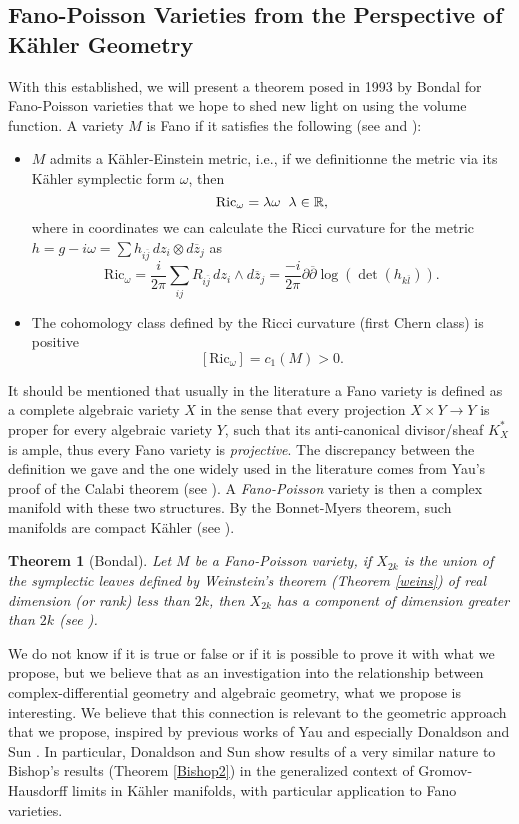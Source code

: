 \documentclass[12pt,twoside,a4paper]{report}
\newtheorem{theorem}{Theorem}[section]
\newcommand{\re}{\ensuremath{\mathbb R }}
\begin{document}
\subsection{Fano-Poisson Varieties from the Perspective of Kähler Geometry}
\noindent With this established, we will present a theorem posed in 1993 by Bondal for Fano-Poisson varieties that we hope to shed new light on using the volume function. A variety $M$ is Fano if it satisfies the following
(see \cite{S-Yau} and \cite{ZB}):
\begin{itemize}
        \item $M$ admits a Kähler-Einstein metric, i.e., if we definitionne the metric via its Kähler symplectic form
        $\omega$, then
                $$\textrm{Ric}_{\omega}=\lambda\omega\hspace{0.2cm}\lambda\in\re,$$
        where in coordinates we can calculate the Ricci curvature for the metric
        \hbox{$h=g-i\omega=\sum h_{i\overline{j}}\,dz_i\otimes d\overline{z}_j$}
        as
$$\textrm{Ric}_{\omega}=\frac{i}{2\pi}\sum_{ij}R_{i\overline{j}}\,dz_i\wedge d\overline{z}_j=\frac{-i}{2\pi}\partial\overline{\partial}\log(\det(h_{k\overline{l}})).$$
        \item The cohomology class defined by the Ricci curvature (first Chern class) is positive
        $$
        [\textrm{Ric}_{\omega}]=c_1(M)>0.
        $$
\end{itemize}
\noindent It should be mentioned that usually in the literature a Fano variety is defined as a complete algebraic variety $X$
in the sense that every projection $X\times Y\rightarrow Y$ is proper for every algebraic variety $Y$, such that its anti-canonical divisor/sheaf
$K^{*}_{X}$ is ample, thus every Fano variety is \emph{projective}. The discrepancy between the definition we gave and the one widely used in
the literature comes from Yau's proof of the Calabi theorem (see \cite{S-Yau}). A
\emph{Fano-Poisson} variety is then a complex manifold with these two structures. By the Bonnet-Myers theorem, such manifolds
are compact Kähler (see \cite{Myers}).
\begin{theorem}[Bondal]\label{Bondal}
  Let $M$ be a Fano-Poisson variety, if $X_{2k}$ is the union of the symplectic leaves defined by Weinstein's theorem (Theorem \ref{weins})
  of real dimension (or rank) less than $2k$, then $X_{2k}$ has a component of dimension greater than $2k$ (see \cite{Bondal}).
\end{theorem}
\noindent We do not know if it is true or false or if it is possible to prove it with what we propose, but we believe that as an
investigation into the relationship between complex-differential geometry and algebraic geometry, what we propose is interesting.
We believe that this connection is relevant to the geometric approach that we propose, inspired by previous works
of Yau \cite{S-Yau} and especially Donaldson and Sun \cite{D-SS}. In particular, Donaldson and Sun show results of a very similar nature
to Bishop's results (Theorem \ref{Bishop2}) in the generalized context of Gromov-Hausdorff limits in
Kähler manifolds, with particular application to Fano varieties.
\end{document}
